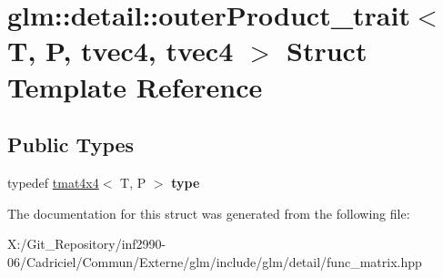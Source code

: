 \hypertarget{structglm_1_1detail_1_1outer_product__trait_3_01_t_00_01_p_00_01tvec4_00_01tvec4_01_4}{\section{glm\-:\-:detail\-:\-:outer\-Product\-\_\-trait$<$ T, P, tvec4, tvec4 $>$ Struct Template Reference}
\label{structglm_1_1detail_1_1outer_product__trait_3_01_t_00_01_p_00_01tvec4_00_01tvec4_01_4}
}
\subsection*{Public Types}
\begin{DoxyCompactItemize}
\item 
\hypertarget{structglm_1_1detail_1_1outer_product__trait_3_01_t_00_01_p_00_01tvec4_00_01tvec4_01_4_a89f0d2b33be6604293d1373176291811}{typedef \hyperlink{structglm_1_1detail_1_1tmat4x4}{tmat4x4}$<$ T, P $>$ {\bfseries type}}\label{structglm_1_1detail_1_1outer_product__trait_3_01_t_00_01_p_00_01tvec4_00_01tvec4_01_4_a89f0d2b33be6604293d1373176291811}

\end{DoxyCompactItemize}


The documentation for this struct was generated from the following file\-:\begin{DoxyCompactItemize}
\item 
X\-:/\-Git\-\_\-\-Repository/inf2990-\/06/\-Cadriciel/\-Commun/\-Externe/glm/include/glm/detail/func\-\_\-matrix.\-hpp\end{DoxyCompactItemize}
